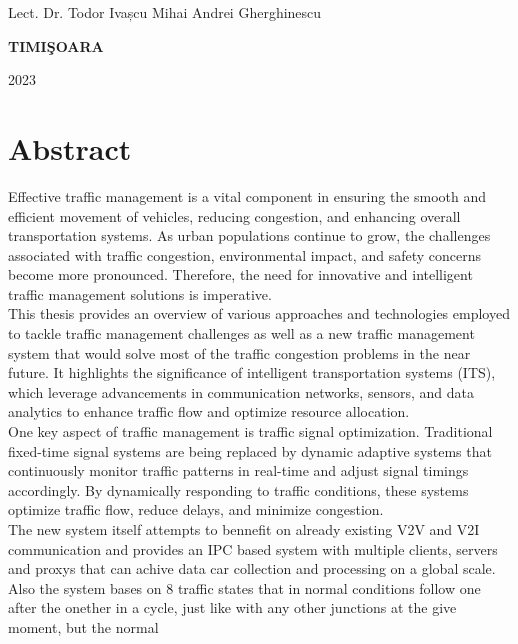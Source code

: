 \documentclass[17pt]{report}
\begin{document}
{\large{}

\noindent Lect. Dr. Todor Ivașcu \hfill 
\noindent Mihai Andrei Gherghinescu
}



\vfill
\begin{center}
{\bf TIMI\c SOARA

2023}
\end{center}

\newpage
\normalsize{}

\section*{Abstract}
\indent \indent
Effective traffic management is a vital component in ensuring
the smooth and efficient movement of vehicles, reducing congestion,
and enhancing overall transportation systems. As urban populations
continue to grow, the challenges associated with traffic congestion,
environmental impact, and safety concerns become more pronounced.
Therefore, the need for innovative and intelligent traffic management
solutions is imperative.\\
\indent
This thesis provides an overview of various approaches and
technologies employed to tackle traffic management challenges as 
well as a new traffic management system that would solve most of 
the traffic congestion problems in the near future. It highlights
the significance of intelligent transportation systems (ITS),
which leverage advancements in communication networks, sensors,
and data analytics to enhance traffic flow and optimize resource
allocation.\\
\indent
One key aspect of traffic management is traffic signal optimization.
Traditional fixed-time signal systems are being replaced by dynamic
adaptive systems that continuously monitor traffic patterns in
real-time and adjust signal timings accordingly. By dynamically
responding to traffic conditions, these systems optimize traffic flow,
reduce delays, and minimize congestion.\\
\indent
The new system itself attempts to bennefit on already existing V2V and 
V2I communication and provides an IPC based system with multiple 
clients, servers and proxys that can achive data car collection and processing
on a global scale. Also the system bases on 8 traffic states that 
in normal conditions follow one after the onether in a cycle, just like
with any other junctions at the give moment, but the normal 
\end{document}
